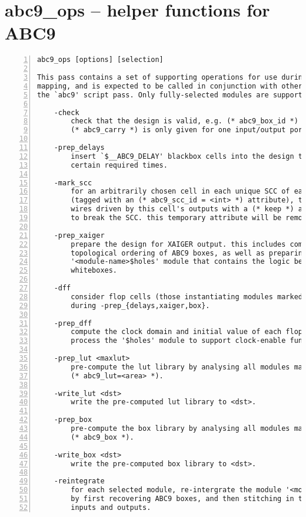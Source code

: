 \section{abc9\_ops -- helper functions for ABC9}
\label{cmd:abc9_ops}
\begin{lstlisting}[numbers=left,frame=single]
    abc9_ops [options] [selection]

This pass contains a set of supporting operations for use during ABC technology
mapping, and is expected to be called in conjunction with other operations from
the `abc9' script pass. Only fully-selected modules are supported.

    -check
        check that the design is valid, e.g. (* abc9_box_id *) values are unique,
        (* abc9_carry *) is only given for one input/output port, etc.

    -prep_delays
        insert `$__ABC9_DELAY' blackbox cells into the design to account for
        certain required times.

    -mark_scc
        for an arbitrarily chosen cell in each unique SCC of each selected module
        (tagged with an (* abc9_scc_id = <int> *) attribute), temporarily mark all
        wires driven by this cell's outputs with a (* keep *) attribute in order
        to break the SCC. this temporary attribute will be removed on -reintegrate.

    -prep_xaiger
        prepare the design for XAIGER output. this includes computing the
        topological ordering of ABC9 boxes, as well as preparing the
        '<module-name>$holes' module that contains the logic behaviour of ABC9
        whiteboxes.

    -dff
        consider flop cells (those instantiating modules marked with (* abc9_flop *))
        during -prep_{delays,xaiger,box}.

    -prep_dff
        compute the clock domain and initial value of each flop in the design.
        process the '$holes' module to support clock-enable functionality.

    -prep_lut <maxlut>
        pre-compute the lut library by analysing all modules marked with
        (* abc9_lut=<area> *).

    -write_lut <dst>
        write the pre-computed lut library to <dst>.

    -prep_box
        pre-compute the box library by analysing all modules marked with
        (* abc9_box *).

    -write_box <dst>
        write the pre-computed box library to <dst>.

    -reintegrate
        for each selected module, re-intergrate the module '<module-name>$abc9'
        by first recovering ABC9 boxes, and then stitching in the remaining primary
        inputs and outputs.
\end{lstlisting}


